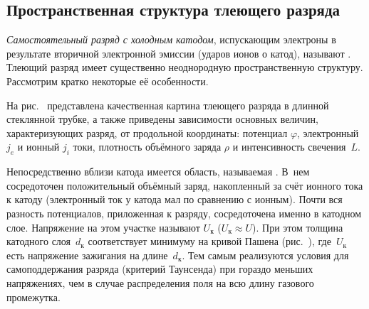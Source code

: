 \subsection*{Пространственная структура тлеющего разряда}

\emph{Самостоятельный разряд с холодным катодом}, испускающим электроны
в результате вторичной электронной эмиссии 
(ударов ионов о катод), называют .
Тлеющий разряд имеет существенно неоднородную пространственную структуру. 
Рассмотрим кратко некоторые её особенности.

На рис.~ представлена качественная картина тлеющего
разряда в длинной стеклянной трубке, а также приведены зависимости
основных величин, характеризующих разряд, от продольной координаты:
потенциал $\varphi$, электронный $j_e$ и ионный $j_i$ токи,
плотность объёмного заряда $\rho$ и интенсивность свечения~$L$.

Непосредственно вблизи катода имеется область, называемая .
В~нем сосредоточен положительный объёмный заряд, накопленный за счёт
ионного тока к катоду (электронный ток у катода мал по сравнению с ионным).
Почти вся разность потенциалов, приложенная к разряду, 
сосредоточена именно в катодном слое.
Напряжение на этом участке называют
 $U_{к}$ ($U_{к} \approx U$).
При этом толщина катодного слоя~$d_{к}$ соответствует минимуму на кривой
Пашена (рис.~), где~$U_{к}$ есть напряжение зажигания
на длине~$d_{к}$. Тем самым реализуются условия для самоподдержания разряда
(критерий Таунсенда) при гораздо меньших напряжениях, 
чем в случае распределения поля на всю длину газового промежутка.

